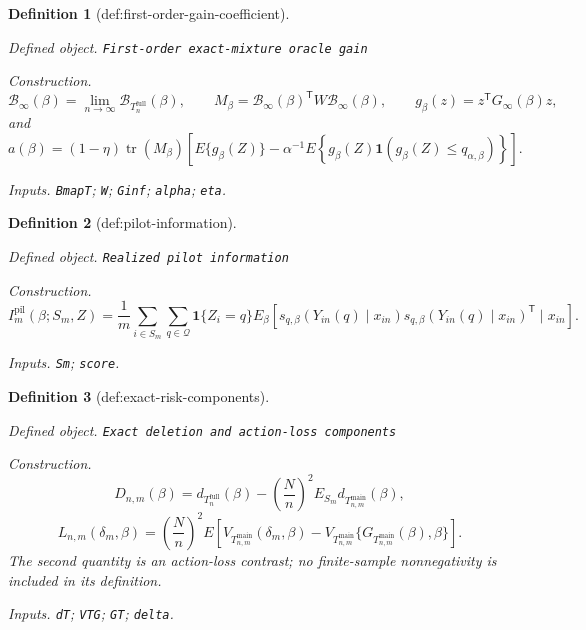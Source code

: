 \documentclass{article}
\newtheorem{definition}{Definition}
\begin{document}
\begin{definition}[def:first-order-gain-coefficient]\label{def:first-order-gain-coefficient}
\par\smallskip\noindent\emph{Defined object.} \texttt{First-\allowbreak{}order exact-\allowbreak{}mixture oracle gain}
\par\smallskip\noindent\emph{Construction.} \[
\mathcal B_\infty(\beta)
=\lim_{n\to\infty}\mathcal B_{T_n^{\mathrm{full}}}(\beta),
\qquad
M_\beta
=\mathcal B_\infty(\beta)^{\mathsf T}W\mathcal B_\infty(\beta),
\qquad
g_\beta(z)=z^{\mathsf T}G_\infty(\beta)z,
\]
and
\[
a(\beta)
=(1-\eta)\operatorname{tr}(M_\beta)
\left[
E\{g_\beta(Z)\}
-\alpha^{-1}E\!\left\{
g_\beta(Z)\mathbf 1(g_\beta(Z)\leq q_{\alpha,\beta})
\right\}
\right].
\]
\par\smallskip\noindent\emph{Inputs.} \texttt{BmapT}; \texttt{W}; \texttt{Ginf}; \texttt{alpha}; \texttt{eta}.
\end{definition}

\begin{definition}[def:pilot-information]\label{def:pilot-information}
\par\smallskip\noindent\emph{Defined object.} \texttt{Realized pilot information}
\par\smallskip\noindent\emph{Construction.} \[
I_m^{\mathrm{pil}}(\beta;S_m,Z)
=\frac1m\sum_{i\in S_m}\sum_{q\in\mathcal Q}
\mathbf 1\{Z_i=q\}
E_\beta\!\left[
s_{q,\beta}(Y_{in}(q)\mid x_{in})
s_{q,\beta}(Y_{in}(q)\mid x_{in})^{\mathsf T}
\mid x_{in}
\right].
\]
\par\smallskip\noindent\emph{Inputs.} \texttt{Sm}; \texttt{score}.
\end{definition}

\begin{definition}[def:exact-risk-components]\label{def:exact-risk-components}
\par\smallskip\noindent\emph{Defined object.} \texttt{Exact deletion and action-\allowbreak{}loss components}
\par\smallskip\noindent\emph{Construction.} \[
D_{n,m}(\beta)
=d_{T_n^{\mathrm{full}}}(\beta)
-\left(\frac Nn\right)^2
E_{S_m}d_{T_{n,m}^{\mathrm{main}}}(\beta),
\]
\[
L_{n,m}(\delta_m,\beta)
=\left(\frac Nn\right)^2
E\!\left[
V_{T_{n,m}^{\mathrm{main}}}(\delta_m,\beta)
-V_{T_{n,m}^{\mathrm{main}}}
\{G_{T_{n,m}^{\mathrm{main}}}(\beta),\beta\}
\right].
\]
The second quantity is an action-loss contrast; no finite-sample nonnegativity is included in its definition.
\par\smallskip\noindent\emph{Inputs.} \texttt{dT}; \texttt{VTG}; \texttt{GT}; \texttt{delta}.
\end{definition}
\end{document}
